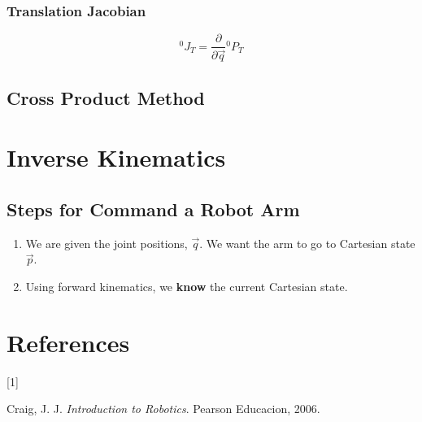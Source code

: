 \documentclass[
  letterpaper,
  DIV=11,
  numbers=noendperiod]{scrreprt}
\providecommand{\tightlist}{%
  \setlength{\itemsep}{0pt}\setlength{\parskip}{0pt}}\usepackage{longtable,booktabs,array}
\newlength{\cslhangindent}
\newlength{\csllabelwidth}
\newlength{\cslentryspacingunit} %
\newenvironment{CSLReferences}[2] %
 {%
  \setlength{\parindent}{0pt}
  \ifodd #1
  \let\oldpar\par
  \def\par{\hangindent=\cslhangindent\oldpar}
  \fi
  \setlength{\parskip}{#2\cslentryspacingunit}
 }%
 {}
\newcommand{\CSLLeftMargin}[1]{\parbox[t]{\csllabelwidth}{#1}}
\newcommand{\CSLRightInline}[1]{\parbox[t]{\linewidth - \csllabelwidth}{#1}\break}
\begin{document}
\hypertarget{translation-jacobian}{%
\subsection{Translation Jacobian}\label{translation-jacobian}}

\[
{}^0J_T = \frac{\partial}{\partial \overrightarrow{q}} {}^0P_T
\]

\hypertarget{cross-product-method}{%
\section{Cross Product Method}\label{cross-product-method}}


\hypertarget{inverse-kinematics-1}{%
\chapter{Inverse Kinematics}\label{inverse-kinematics-1}}

\hypertarget{steps-for-command-a-robot-arm}{%
\section{Steps for Command a Robot
Arm}\label{steps-for-command-a-robot-arm}}

\begin{enumerate}
\def\labelenumi{\arabic{enumi}.}
\tightlist
\item
  We are given the joint positions, \(\overrightarrow{q}\). We want the
  arm to go to Cartesian state \(\overrightarrow{p}\).
\item
  Using forward kinematics, we \textbf{know} the current Cartesian
  state.
\end{enumerate}


\hypertarget{references}{%
\chapter*{References}\label{references}}


\hypertarget{refs}{}
\begin{CSLReferences}{0}{0}
\leavevmode{}%
\CSLLeftMargin{{[}1{]} }%
\CSLRightInline{Craig, J. J. \emph{Introduction to Robotics}. Pearson
Educacion, 2006.}

\end{CSLReferences}
\end{document}
